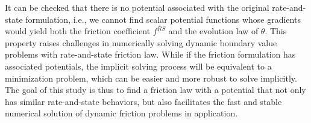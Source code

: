 It can be checked that there is no potential associated with the original rate-and-state formulation, 
i.e., 
we cannot find scalar potential functions whose gradients would yield both the friction coefficient $f^{RS}$ and the evolution law of $\theta$. 
This property raises challenges in numerically solving dynamic boundary value problems with rate-and-state friction law. 
While if the friction formulation has associated potentials, 
the implicit solving process will be equivalent to a minimization problem, 
which can be easier and more robust to solve implicitly. 
The goal of this study is thus to find a friction law with a potential that not only has similar rate-and-state behaviors, 
but also facilitates the fast and stable numerical solution of dynamic friction problems in application. 